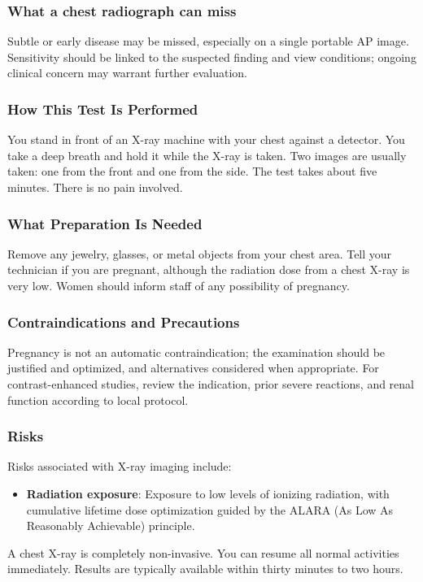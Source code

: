 \subsubsection*{What a chest radiograph can miss}
Subtle or early disease may be missed, especially on a single portable AP image. Sensitivity should be linked to the suspected finding and view conditions; ongoing clinical concern may warrant further evaluation.

\subsubsection*{How This Test Is Performed}
You stand in front of an X-ray machine with your chest against a detector. You take a deep breath and hold it while the X-ray is taken. Two images are usually taken: one from the front and one from the side. The test takes about five minutes. There is no pain involved.

\subsubsection*{What Preparation Is Needed}
Remove any jewelry, glasses, or metal objects from your chest area. Tell your technician if you are pregnant, although the radiation dose from a chest X-ray is very low. Women should inform staff of any possibility of pregnancy.

\subsubsection*{Contraindications and Precautions}
Pregnancy is not an automatic contraindication; the examination should be justified and optimized, and alternatives considered when appropriate. For contrast-enhanced studies, review the indication, prior severe reactions, and renal function according to local protocol.

\subsubsection*{Risks}
Risks associated with X-ray imaging include:
\begin{itemize}
    \item \textbf{Radiation exposure}: Exposure to low levels of ionizing radiation, with cumulative lifetime dose optimization guided by the ALARA (As Low As Reasonably Achievable) principle.
\end{itemize}


A chest X-ray is completely non-invasive. You can resume all normal activities immediately. Results are typically available within thirty minutes to two hours.

